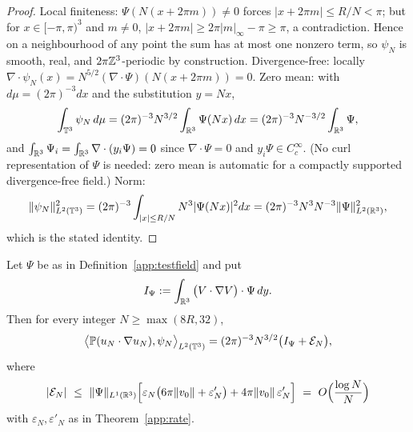 \begin{proof}
Local finiteness: $\Psi(N(x+2\pi m))\neq0$ forces
$|x+2\pi m|\le R/N<\pi$; but for $x\in[-\pi,\pi)^3$ and $m\neq0$,
$|x+2\pi m|\ge2\pi|m|_\infty-\pi\ge\pi$, a contradiction. Hence on a
neighbourhood of any point the sum has at most one nonzero term, so
$\psi_N$ is smooth, real, and $2\pi\mathbb Z^3$-periodic by construction.
Divergence-free: locally
$\nabla\cdot\psi_N(x)=N^{5/2}(\nabla\cdot\Psi)(N(x+2\pi m))=0$.
Zero mean: with $d\mu=(2\pi)^{-3}dx$ and the substitution $y=Nx$,
\[
\int_{\mathbb T^3}\psi_N\,d\mu
=(2\pi)^{-3}N^{3/2}\int_{\mathbb R^3}\Psi(Nx)\,dx
=(2\pi)^{-3}N^{-3/2}\int_{\mathbb R^3}\Psi ,
\]
and $\int_{\mathbb R^3}\Psi_i=\int_{\mathbb R^3}\nabla\cdot(y_i\Psi)=0$ since
$\nabla\cdot\Psi=0$ and $y_i\Psi\in C^\infty_c$. (No curl
representation of $\Psi$ is needed: zero mean is automatic for a
compactly supported divergence-free field.) Norm:
\[
\|\psi_N\|_{L^2(\mathbb T^3)}^2
=(2\pi)^{-3}\int_{|x|\le R/N}N^{3}|\Psi(Nx)|^2dx
=(2\pi)^{-3}N^{3}N^{-3}\|\Psi\|_{L^2(\mathbb R^3)}^2 ,
\]
which is the stated identity.
\end{proof}

\begin{theorem}\label{app:pairing}
Let $\Psi$ be as in Definition~\ref{app:testfield} and put
\[
I_\Psi:=\int_{\mathbb R^3}\big(V\cdot\nabla V\big)\cdot\Psi\,dy .
\]
Then for every integer $N\ge\max(8R,32)$,
\[
\big\langle\mathbb P(u_N\cdot\nabla u_N),\psi_N\big\rangle_{L^2(\mathbb T^3)}
=(2\pi)^{-3}N^{3/2}\big(I_\Psi+\mathcal E_N\big),
\]
where
\[
|\mathcal E_N|\ \le\ \|\Psi\|_{L^1(\mathbb R^3)}
\Big[\varepsilon_N\big(6\pi\|v_0\|+\varepsilon'_N\big)
+4\pi\|v_0\|\,\varepsilon'_N\Big]
\ =\ O\Big(\frac{\log N}{N}\Big)
\]
with $\varepsilon_N,\varepsilon'_N$ as in Theorem~\ref{app:rate}.
\end{theorem}

